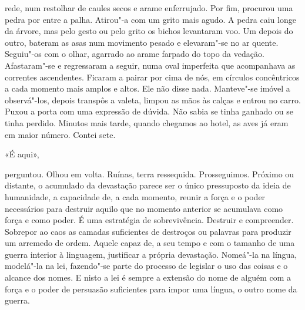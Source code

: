 rede, num restolhar de caules secos e arame enferrujado. Por fim,
procurou uma pedra por entre a palha. Atirou"-a com um grito mais agudo.
A pedra caiu longe da árvore, mas pelo gesto ou pelo grito os bichos
levantaram voo. Um depois do outro, bateram as asas num movimento pesado
e elevaram"-se no ar quente. Seguiu"-os com o olhar, agarrado ao arame
farpado do topo da vedação. Afastaram"-se e regressaram a seguir, numa
oval imperfeita que acompanhava as correntes ascendentes. Ficaram a
pairar por cima de nós, em círculos concêntricos a cada momento mais
amplos e altos. Ele não disse nada. Manteve"-se imóvel a observá"-los,
depois transpôs a valeta, limpou as mãos às calças e entrou no carro.
Puxou a porta com uma expressão de dúvida. Não sabia se tinha ganhado ou
se tinha perdido. Minutos mais tarde, quando chegamos ao hotel, as aves
já eram em maior número. Contei sete.

«É aqui»,

perguntou. Olhou em volta. Ruínas, terra ressequida. Prosseguimos.
Próximo ou distante, o acumulado da devastação parece ser o único
pressuposto da ideia de humanidade, a capacidade de, a cada momento,
reunir a força e o poder necessários para destruir aquilo que no momento
anterior se acumulava como força e como poder. É uma estratégia de
sobrevivência. Destruir e compreender. Sobrepor ao caos as camadas
suficientes de destroços ou palavras para produzir um arremedo de ordem.
Aquele capaz de, a seu tempo e com o tamanho de uma guerra interior à
linguagem, justificar a própria devastação. Nomeá"-la na língua,
modelá"-la na lei, fazendo"-se parte do processo de legislar o uso das
coisas e o alcance dos nomes. E nisto a lei é sempre a extensão do nome
de alguém com a força e o poder de persuasão suficientes para impor uma
língua, o outro nome da guerra.

